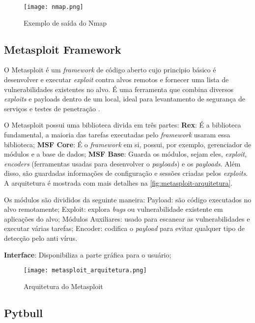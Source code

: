  \begin{figure}[htb]
  \centering
  \caption{Exemplo de saída do Nmap}
  \texttt{[image: nmap.png]}
  \legend{}
  \label{fig:nmap-exemplo}
 \end{figure}

 \subsection{Metasploit Framework} \label{sec:metasploit}

 O Metasploit é um \textit{framework} de código aberto cujo principio básico é desenvolver e executar \textit{exploit} contra alvos remotos e fornecer uma lista de vulnerabilidades existentes no alvo. É uma ferramenta que combina diversos \textit{exploits} e payloads dentro de um local, ideal para levantamento de segurança de serviços e testes de penetração \cite{metasploit:yash}.  

 O Metasploit possui uma biblioteca divida em três partes: \textbf{Rex}: É a biblioteca fundamental, a maioria das tarefas executadas pelo \textit{framework} usaram essa biblioteca; \textbf{MSF Core}: É o \textit{framework} em si, possui, por exemplo, gerenciador de módulos e a base de dados; \textbf{MSF Base}: Guarda os módulos, sejam eles, \textit{exploit}, \textit{encoders} (ferramentas usadas para desenvolver o \textit{payloads}) e os \textit{payloads}. Além disso, são guardadas informações de configuração e sessões criadas pelos \textit{exploits}. A arquitetura é mostrada com mais detalhes na \autoref{fig:metasploit-arquitetura}. 

 Os módulos são divididos da seguinte maneira: Payload: são código executados no alvo remotamente; Exploit: explora \textit{bugs} ou vulnerabilidade existente em aplicações do alvo; Módulos Auxiliares: usado para escanear as vulnerabilidades e executar várias tarefas; Encoder: codifica o \textit{payload} para evitar qualquer tipo de detecção pelo anti vírus.

 \textbf{Interface}: Disponibiliza a parte gráfica para o usuário;

 \begin{figure}[!htb]
  \centering
  \caption{Arquitetura do Metasploit}
  \texttt{[image: metasploit\_arquitetura.png]}
  \label{fig:metasploit-arquitetura}
 \end{figure}

 \subsection{Pytbull} \label{sec:pytbull}

